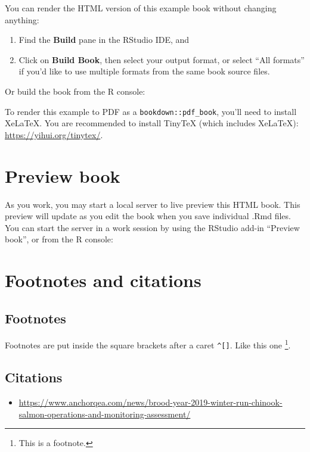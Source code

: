\documentclass[
]{book}
\providecommand{\tightlist}{%
  \setlength{\itemsep}{0pt}\setlength{\parskip}{0pt}}
\theoremstyle{definition}
\theoremstyle{definition}
\theoremstyle{definition}
\theoremstyle{definition}
\theoremstyle{remark}
\begin{document}
You can render the HTML version of this example book without changing anything:

\begin{enumerate}
\def\labelenumi{\arabic{enumi}.}
\item
  Find the \textbf{Build} pane in the RStudio IDE, and
\item
  Click on \textbf{Build Book}, then select your output format, or select ``All formats'' if you'd like to use multiple formats from the same book source files.
\end{enumerate}

Or build the book from the R console:

To render this example to PDF as a \texttt{bookdown::pdf\_book}, you'll need to install XeLaTeX. You are recommended to install TinyTeX (which includes XeLaTeX): \url{https://yihui.org/tinytex/}.

\hypertarget{preview-book}{%
\section{Preview book}\label{preview-book}}

As you work, you may start a local server to live preview this HTML book. This preview will update as you edit the book when you save individual .Rmd files. You can start the server in a work session by using the RStudio add-in ``Preview book'', or from the R console:

\hypertarget{footnotes-and-citations-1}{%
\section{Footnotes and citations}\label{footnotes-and-citations-1}}

\hypertarget{footnotes-1}{%
\subsection{Footnotes}\label{footnotes-1}}

Footnotes are put inside the square brackets after a caret \texttt{\^{}{[}{]}}. Like this one \footnote{This is a footnote.}.

\hypertarget{citations-1}{%
\subsection{Citations}\label{citations-1}}

\begin{itemize}
\tightlist
\item
  \url{https://www.anchorqea.com/news/brood-year-2019-winter-run-chinook-salmon-operations-and-monitoring-assessment/}
\end{itemize}
\end{document}

